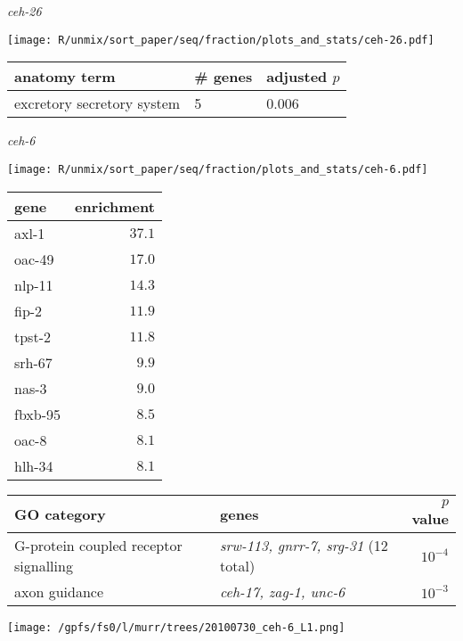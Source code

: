 \documentclass[serif,9pt]{beamer}
\begin{document}
\begin{frame}{{\em ceh-26}}

\begin{minipage}{0.4\textwidth}
\texttt{[image: R/unmix/sort\_paper/seq/fraction/plots\_and\_stats/ceh-26.pdf]}
\end{minipage}
\begin{minipage}{0.58\textwidth}

\begin{tabular}{lll}
anatomy term & \# genes & adjusted $p$ \\
\hline
excretory secretory system & 5 & 0.006 
\end{tabular}
\end{minipage}

\end{frame}

\begin{frame}{{\em ceh-6}}

\begin{minipage}{0.4\textwidth}
\texttt{[image: R/unmix/sort\_paper/seq/fraction/plots\_and\_stats/ceh-6.pdf]}
\end{minipage}
\begin{minipage}{0.58\textwidth}
\begin{table}[!tbp]\footnotesize
\begin{tabular}{lr}
\multicolumn{1}{l}{gene}&\multicolumn{1}{c}{enrichment}\tabularnewline
\hline
axl-1&$37.1$\tabularnewline
oac-49&$17.0$\tabularnewline
nlp-11&$14.3$\tabularnewline
fip-2&$11.9$\tabularnewline
tpst-2&$11.8$\tabularnewline
srh-67&$ 9.9$\tabularnewline
nas-3&$ 9.0$\tabularnewline
fbxb-95&$ 8.5$\tabularnewline
oac-8&$ 8.1$\tabularnewline
hlh-34&$ 8.1$\tabularnewline
\hline
\end{tabular}
\end{table}

\end{minipage}

\begin{table}\footnotesize
\begin{tabular}{llr}
GO category & genes & $p$ value \\
\hline
G-protein coupled receptor signalling & {\em srw-113, gnrr-7, srg-31} (12 total) & $10^{-4}$ \\
axon guidance & {\em ceh-17, zag-1, unc-6} & $10^{-3}$ \\
\end{tabular}
\end{table}

\texttt{[image: /gpfs/fs0/l/murr/trees/20100730\_ceh-6\_L1.png]}
\end{frame}
\end{document}

